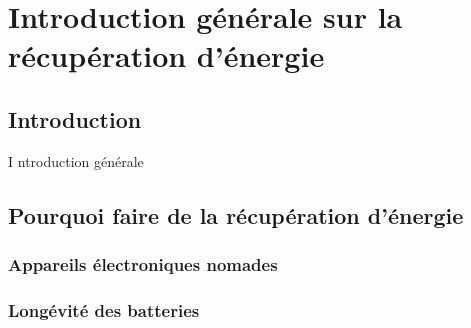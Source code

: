 
\lhead[\fancyplain{}{\leftmark}]%
      {\fancyplain{}{}} %
\chead[\fancyplain{}{}]%
      {\fancyplain{}{}}
\rhead[\fancyplain{}{}]%
      {\fancyplain{}{\rightmark}}%
\lfoot[\fancyplain{}{}]%
      {\fancyplain{}{}}
\cfoot[\fancyplain{}{\thepage}]%
      {\fancyplain{}{\thepage}} %
\rfoot[\fancyplain{}{}]%
      {\fancyplain{}{\scriptsize}}
      

\chapter{Introduction générale sur la récupération d’énergie}
\label{ch:1}
\minitoc
\newpage
\section{Introduction}
\label{sec:1.intro}
\lettrine[lines=1]{I}{ }ntroduction générale \cite{Bob2000} \cite{Agashe2008}

\section{Pourquoi faire de la récupération d’énergie}
\label{sec:1.1}

 \subsection{Appareils électroniques nomades}
 \label{subsec:1.1.1}

 \subsection{Longévité des batteries}
\label{subsec:1.1.2}

